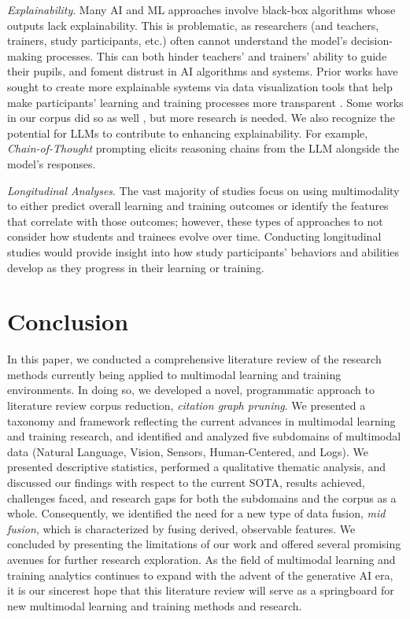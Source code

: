 \documentclass[manuscript,screen,review]{acmart}
\begin{document}
\textit{Explainability}. Many AI and ML approaches involve black-box algorithms whose outputs lack explainability. This is problematic, as researchers (and teachers, trainers, study participants, etc.) often cannot understand the model's decision-making processes. This can both hinder teachers' and trainers' ability to guide their pupils, and foment distrust in AI algorithms and systems. Prior works have sought to create more explainable systems via data visualization tools that help make participants' learning and training processes more transparent \cite{hutchins2022co,vatral2023comparative,davalos2023chimerapy}. Some works in our corpus did so as well \cite{2609260641,2879332689}, but more research is needed. We also recognize the potential for LLMs to contribute to enhancing explainability. For example, \textit{Chain-of-Thought} prompting \cite{wei2022chain,cohn2023chain} elicits reasoning chains from the LLM alongside the model's responses.

\textit{Longitudinal Analyses}. The vast majority of studies focus on using multimodality to either predict overall learning and training outcomes or identify the features that correlate with those outcomes; however, these types of approaches to not consider how students and trainees evolve over time. Conducting longitudinal studies would provide insight into how study participants' behaviors and abilities develop as they progress in their learning or training. 

\section{Conclusion}
In this paper, we conducted a comprehensive literature review of the research methods currently being applied to multimodal learning and training environments. In doing so, we developed a novel, programmatic approach to literature review corpus reduction, \textit{citation graph pruning}. We presented a taxonomy and framework reflecting the current advances in multimodal learning and training research, and identified and analyzed five subdomains of multimodal data (Natural Language, Vision, Sensors, Human-Centered, and Logs). We presented descriptive statistics, performed a qualitative thematic analysis, and discussed our findings with respect to the current SOTA, results achieved, challenges faced, and research gaps for both the subdomains and the corpus as a whole. Consequently, we identified the need for a new type of data fusion, \textit{mid fusion}, which is characterized by fusing derived, observable features. We concluded by presenting the limitations of our work and offered several promising avenues for further research exploration. As the field of multimodal learning and training analytics continues to expand with the advent of the generative AI era, it is our sincerest hope that this literature review will serve as a springboard for new multimodal learning and training methods and research.
\end{document}
